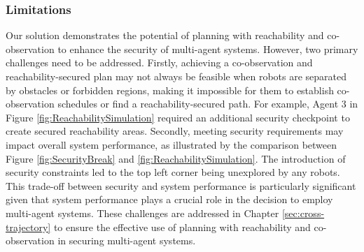 \documentclass[10pt,twocolumn,twoside]{IEEEtran}
\begin{document}



\subsubsection{Limitations}\label{sec:reachability-discussion}
Our solution demonstrates the potential of planning with reachability and co-observation to enhance the security of multi-agent systems. However, two primary challenges need to be addressed. Firstly, achieving a co-observation and reachability-secured plan may not always be feasible when robots are separated by obstacles or forbidden regions, making it impossible for them to establish co-observation schedules or find a reachability-secured path. For example, Agent 3 in Figure \ref{fig:ReachabilitySimulation} required an additional security checkpoint to create secured reachability areas. Secondly, meeting security requirements may impact overall system performance, as illustrated by the comparison between Figure \ref{fig:SecurityBreak} and \ref{fig:ReachabilitySimulation}. The introduction of security constraints led to the top left corner being unexplored by any robots. This trade-off between security and system performance is particularly significant given that system performance plays a crucial role in the decision to employ multi-agent systems. These challenges are addressed in Chapter \ref{sec:cross-trajectory} to ensure the effective use of planning with reachability and co-observation in securing multi-agent systems.
\end{document}
